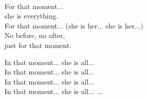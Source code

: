 \begin{lyrics}
\\
For that moment...\\
she is everything.\\
For that moment...
(she is her... she is her...)\\
No before, no after,\\
just for that moment.

In that moment... she is all...\\
In that moment... she is all...\\
In that moment... she is all...\\
In that moment... she is all...
...
\end{lyrics}

